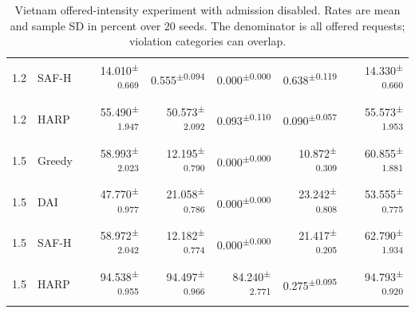 \documentclass[final,5p]{elsarticle}
\begin{document}
\begin{table}[p]
\begin{tabular}{llrrrrr}
1.2 & SAF-H & 14.010\textsuperscript{$\pm$0.669} & 0.555\textsuperscript{$\pm$0.094} & 0.000\textsuperscript{$\pm$0.000} & 0.638\textsuperscript{$\pm$0.119} & 14.330\textsuperscript{$\pm$0.660} \\
1.2 & HARP & 55.490\textsuperscript{$\pm$1.947} & 50.573\textsuperscript{$\pm$2.092} & 0.093\textsuperscript{$\pm$0.110} & 0.090\textsuperscript{$\pm$0.057} & 55.573\textsuperscript{$\pm$1.953} \\
1.5 & Greedy & 58.993\textsuperscript{$\pm$2.023} & 12.195\textsuperscript{$\pm$0.790} & 0.000\textsuperscript{$\pm$0.000} & 10.872\textsuperscript{$\pm$0.309} & 60.855\textsuperscript{$\pm$1.881} \\
1.5 & DAI & 47.770\textsuperscript{$\pm$0.977} & 21.058\textsuperscript{$\pm$0.786} & 0.000\textsuperscript{$\pm$0.000} & 23.242\textsuperscript{$\pm$0.808} & 53.555\textsuperscript{$\pm$0.775} \\
1.5 & SAF-H & 58.972\textsuperscript{$\pm$2.042} & 12.182\textsuperscript{$\pm$0.774} & 0.000\textsuperscript{$\pm$0.000} & 21.417\textsuperscript{$\pm$0.205} & 62.790\textsuperscript{$\pm$1.934} \\
1.5 & HARP & 94.538\textsuperscript{$\pm$0.955} & 94.497\textsuperscript{$\pm$0.966} & 84.240\textsuperscript{$\pm$2.771} & 0.275\textsuperscript{$\pm$0.095} & 94.793\textsuperscript{$\pm$0.920} \\
\bottomrule
\end{tabular}
\caption{Vietnam offered-intensity experiment with admission disabled. Rates are mean and sample SD in percent over 20 seeds. The denominator is all offered requests; violation categories can overlap.}
\label{tab:load_sweep_unprotected}
\end{table}
\end{document}

